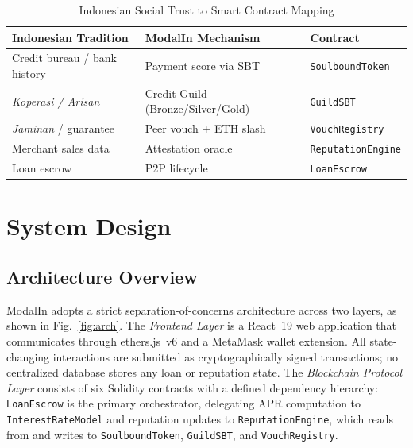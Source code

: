 \documentclass[conference]{IEEEtran}
\begin{document}
\begin{table}[t]
\caption{Indonesian Social Trust to Smart Contract Mapping}
\label{tab:mapping}
\centering
\begin{tabular}{p{1.9cm}p{2.0cm}p{2.0cm}}
\toprule
\textbf{Indonesian Tradition} & \textbf{ModalIn Mechanism} & \textbf{Contract} \\
\midrule
Credit bureau / bank history  & Payment score via SBT & \texttt{SoulboundToken} \\
\textit{Koperasi / Arisan}    & Credit Guild (Bronze/Silver/Gold) & \texttt{GuildSBT} \\
\textit{Jaminan} / guarantee  & Peer vouch + ETH slash & \texttt{VouchRegistry} \\
Merchant sales data           & Attestation oracle     & \texttt{ReputationEngine} \\
Loan escrow                   & P2P lifecycle          & \texttt{LoanEscrow} \\
\bottomrule
\end{tabular}
\end{table}

\section{System Design}

\subsection{Architecture Overview}

ModalIn adopts a strict separation-of-concerns architecture across two layers,
as shown in Fig.~\ref{fig:arch}. The \textit{Frontend Layer} is a React~19
web application that communicates through ethers.js~v6 and a MetaMask wallet
extension. All state-changing interactions are submitted as cryptographically
signed transactions; no centralized database stores any loan or reputation
state. The \textit{Blockchain Protocol Layer} consists of six Solidity
contracts with a defined dependency hierarchy: \texttt{LoanEscrow} is the
primary orchestrator, delegating APR computation to
\texttt{InterestRateModel} and reputation updates to
\texttt{ReputationEngine}, which reads from and writes to
\texttt{SoulboundToken}, \texttt{GuildSBT}, and \texttt{VouchRegistry}.
\end{document}
